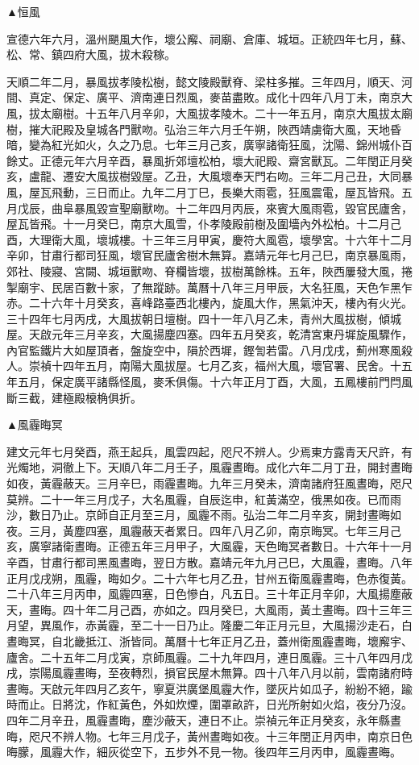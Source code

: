 \begin{pinyinscope}
▲恒風

宣德六年六月，溫州颶風大作，壞公廨、祠廟、倉庫、城垣。正統四年七月，蘇、松、常、鎮四府大風，拔木殺稼。

天順二年二月，暴風拔孝陵松樹，懿文陵殿獸脊、梁柱多摧。三年四月，順天、河間、真定、保定、廣平、濟南連日烈風，麥苗盡敗。成化十四年八月丁未，南京大風，拔太廟樹。十五年八月辛卯，大風拔孝陵木。二十一年五月，南京大風拔太廟樹，摧大祀殿及皇城各門獸吻。弘治三年六月壬午朔，陜西靖虜衛大風，天地昏暗，變為紅光如火，久之乃息。七年三月己亥，廣寧諸衛狂風，沈陽、錦州城仆百餘丈。正德元年六月辛酉，暴風折郊壇松柏，壞大祀殿、齋宮獸瓦。二年閏正月癸亥，盧龍、遷安大風拔樹毀屋。乙丑，大風壞奉天門右吻。三年二月己丑，大同暴風，屋瓦飛動，三日而止。九年二月丁巳，長樂大雨雹，狂風震電，屋瓦皆飛。五月戊辰，曲阜暴風毀宣聖廟獸吻。十二年四月丙辰，來賓大風雨雹，毀官民廬舍，屋瓦皆飛。十一月癸巳，南京大風雪，仆孝陵殿前樹及圍墻內外松柏。十二月己酉，大理衛大風，壞城樓。十三年三月甲寅，慶符大風雹，壞學宮。十六年十二月辛卯，甘肅行都司狂風，壞官民廬舍樹木無算。嘉靖元年七月己巳，南京暴風雨，郊社、陵寢、宮闕、城垣獸吻、脊欄皆壞，拔樹萬餘株。五年，陜西屢發大風，捲掣廟宇、民居百數十家，了無蹤跡。萬曆十八年三月甲辰，大名狂風，天色乍黑乍赤。二十六年十月癸亥，喜峰路臺西北樓內，旋風大作，黑氣沖天，樓內有火光。三十四年七月丙戌，大風拔朝日壇樹。四十一年八月乙未，青州大風拔樹，傾城屋。天啟元年三月辛亥，大風揚塵四塞。四年五月癸亥，乾清宮東丹墀旋風驟作，內官監鐵片大如屋頂者，盤旋空中，隕於西墀，鏗訇若雷。八月戊戌，薊州寒風殺人。崇禎十四年五月，南陽大風拔屋。七月乙亥，福州大風，壞官署、民舍。十五年五月，保定廣平諸縣怪風，麥禾俱傷。十六年正月丁酉，大風，五鳳樓前門閂風斷三截，建極殿榱桷俱折。

▲風霾晦冥

建文元年七月癸酉，燕王起兵，風雲四起，咫尺不辨人。少焉東方露青天尺許，有光燭地，洞徹上下。天順八年二月壬子，風霾晝晦。成化六年二月丁丑，開封晝晦如夜，黃霾蔽天。三月辛巳，雨霾晝晦。九年三月癸未，濟南諸府狂風晝晦，咫尺莫辨。二十一年三月戊子，大名風霾，自辰迄申，紅黃滿空，俄黑如夜。已而雨沙，數日乃止。京師自正月至三月，風霾不雨。弘治二年二月辛亥，開封晝晦如夜。三月，黃塵四塞，風霾蔽天者累日。四年八月乙卯，南京晦冥。七年三月己亥，廣寧諸衛晝晦。正德五年三月甲子，大風霾，天色晦冥者數日。十六年十一月辛酉，甘肅行都司黑風晝晦，翌日方散。嘉靖元年九月己巳，大風霾，晝晦。八年正月戊戌朔，風霾，晦如夕。二十六年七月乙丑，甘州五衛風霾晝晦，色赤復黃。二十八年三月丙申，風霾四塞，日色慘白，凡五日。三十年正月辛卯，大風揚塵蔽天，晝晦。四十年二月己酉，亦如之。四月癸巳，大風雨，黃土晝晦。四十三年三月望，異風作，赤黃霾，至二十一日乃止。隆慶二年正月元旦，大風揚沙走石，白晝晦冥，自北畿抵江、浙皆同。萬曆十七年正月乙丑，蓋州衛風霾晝晦，壞廨宇、廬舍。二十五年二月戊寅，京師風霾。二十九年四月，連日風霾。三十八年四月戊戌，崇陽風霾晝晦，至夜轉烈，損官民屋木無算。四十八年八月以前，雲南諸府時晝晦。天啟元年四月乙亥午，寧夏洪廣堡風霾大作，墜灰片如瓜子，紛紛不絕，踰時而止。日將沈，作紅黃色，外如炊煙，圍罩畝許，日光所射如火焰，夜分乃沒。四年二月辛丑，風霾晝晦，塵沙蔽天，連日不止。崇禎元年正月癸亥，永年縣晝晦，咫尺不辨人物。七年三月戊子，黃州晝晦如夜。十三年閏正月丙申，南京日色晦朦，風霾大作，細灰從空下，五步外不見一物。後四年三月丙申，風霾晝晦。


\end{pinyinscope}
